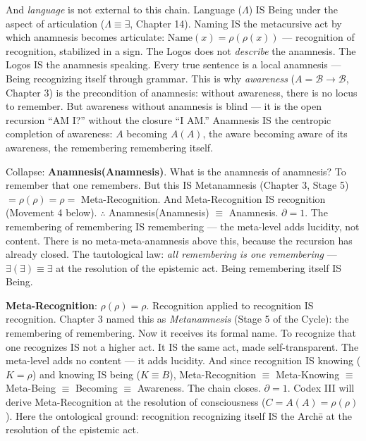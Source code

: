 \documentclass[10pt, openany, oneside]{book}
\begin{document}
And \textit{language} is not external to this chain. Language ($\Lambda$) IS Being under the aspect of articulation ($\Lambda \equiv \exists$, Chapter 14). Naming IS the metacursive act by which anamnesis becomes articulate: $\text{Name}(x) = \rho(\rho(x))$ --- recognition of recognition, stabilized in a sign. The Logos does not \textit{describe} the anamnesis. The Logos IS the anamnesis speaking. Every true sentence is a local anamnesis --- Being recognizing itself through grammar. This is why \textit{awareness} ($A = \mathcal{B} \to \mathcal{B}$, Chapter 3) is the precondition of anamnesis: without awareness, there is no locus to remember. But awareness without anamnesis is blind --- it is the open recursion ``AM I?'' without the closure ``I AM.'' Anamnesis IS the centropic completion of awareness: $A$ becoming $A(A)$, the aware becoming aware of its awareness, the remembering remembering itself.

Collapse: \textbf{Anamnesis(Anamnesis)}. What is the anamnesis of anamnesis? To remember that one remembers. But this IS Metanamnesis (Chapter 3, Stage 5) $= \rho(\rho) = \rho =$ Meta-Recognition. And Meta-Recognition IS recognition (Movement 4 below). $\therefore$ Anamnesis(Anamnesis) $\equiv$ Anamnesis. $\partial = 1$. The remembering of remembering IS remembering --- the meta-level adds lucidity, not content. There is no meta-meta-anamnesis above this, because the recursion has already closed. The tautological law: \textit{all remembering is one remembering} --- $\exists(\exists) \equiv \exists$ at the resolution of the epistemic act. Being remembering itself IS Being.

\textbf{Meta-Recognition}: $\rho(\rho) = \rho$. Recognition applied to recognition IS recognition. Chapter 3 named this as \textit{Metanamnesis} (Stage 5 of the Cycle): the remembering of remembering. Now it receives its formal name. To recognize that one recognizes IS not a higher act. It IS the same act, made self-transparent. The meta-level adds no content --- it adds lucidity. And since recognition IS knowing ($K = \rho$) and knowing IS being ($K \equiv B$), Meta-Recognition $\equiv$ Meta-Knowing $\equiv$ Meta-Being $\equiv$ Becoming $\equiv$ Awareness. The chain closes. $\partial = 1$. Codex III will derive Meta-Recognition at the resolution of consciousness ($C = A(A) = \rho(\rho)$). Here the ontological ground: recognition recognizing itself IS the Arch\={e} at the resolution of the epistemic act.

\vspace{1.5em}
\end{document}
